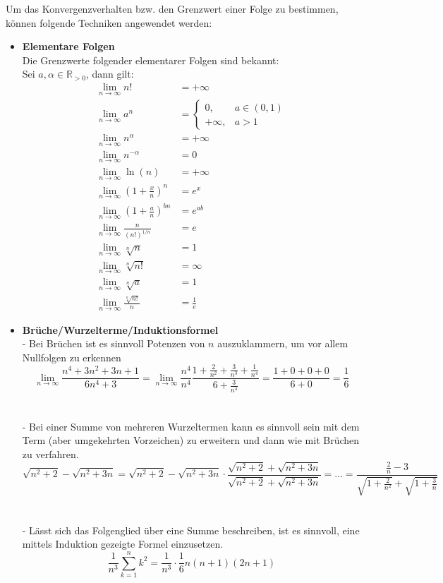 \documentclass{article}
\newcommand{\lr}[1]{\left(#1\right)}
\begin{document}
Um das Konvergenzverhalten bzw. den Grenzwert einer Folge zu bestimmen, können folgende Techniken angewendet werden:
\begin{itemize}
	\item \textbf{Elementare Folgen}\\
	Die Grenzwerte folgender elementarer Folgen sind bekannt:\\
	Sei $a,\alpha \in \mathbb{R}_{>0}$, dann gilt:
	\begin{align*}
		\lim_{n\rightarrow\infty} n! &= +\infty\\
		\lim_{n\rightarrow\infty} a^n &= 
			\begin{cases}
				0, & a\in(0,1)\\
				+\infty, & a > 1
			\end{cases}\\
		\lim_{n\rightarrow\infty} n^\alpha &= +\infty\\
		\lim_{n\rightarrow\infty} n^{-\alpha} &= 0\\
		\lim_{n\rightarrow\infty} \ln(n) &= +\infty\\
		\lim_{n\rightarrow\infty} \lr{1 + \frac{x}{n}}^n &= e^x\\
		\lim_{n\rightarrow\infty} \lr{1 + \frac{a}{n}}^{bn} &= e^{ab}\\
		\lim_{n\rightarrow\infty} \frac{n}{(n!)^{1/n}} &= e\\
		\lim_{n\rightarrow\infty} \sqrt[n]{n} &= 1\\
		\lim_{n\rightarrow\infty} \sqrt[n]{n!} &= \infty\\
		\lim_{n\rightarrow\infty} \sqrt[n]{a} &= 1\\
		\lim_{n\rightarrow\infty} \frac{\sqrt[n]{n!}}{n} &= \frac{1}{e}
	\end{align*}


\newpage


	\item \textbf{Brüche/Wurzelterme/Induktionsformel}\\
	- Bei Brüchen ist es sinnvoll Potenzen von $n$ auszuklammern, um vor allem Nullfolgen zu erkennen\\
	{\color{blue}
		$$\lim_{n\rightarrow\infty} \frac{n^4 + 3n^2 + 3n + 1}{6n^4 + 3} = \lim_{n\rightarrow\infty} \frac{{n^4}}{{n^4}} \frac{1 + \frac{2}{n^2} + \frac{3}{n^3} + \frac{1}{n^4}}{6 + \frac{3}{n^4}} = \frac{1 + 0 + 0 + 0}{6 + 0} = \frac{1}{6}$$
	}\\
	\\
	- Bei einer Summe von mehreren Wurzeltermen kann es sinnvoll sein mit dem Term (aber umgekehrten Vorzeichen) zu erweitern und dann wie mit Brüchen zu verfahren.\\
	{\color{blue}
		$$\sqrt{n^2 + 2} - \sqrt{n^2 + 3n} = \sqrt{n^2 + 2} - \sqrt{n^2 + 3n} \cdot \frac{\sqrt{n^2 + 2} + \sqrt{n^2 + 3n}}{\sqrt{n^2 + 2} + \sqrt{n^2 + 3n}} = ... = \frac{\frac{2}{n} - 3}{\sqrt{1 + \frac{2}{n^2}} + \sqrt{1 + \frac{3}{n}}}$$}\\
	\\
	- Lässt sich das Folgenglied über eine Summe beschreiben, ist es sinnvoll, eine mittels Induktion gezeigte Formel einzusetzen.\\
	{\color{blue}
		$$\frac{1}{n^3} \sum_{k=1}^n k^2 = \frac{1}{n^3} \cdot \frac{1}{6}n(n+1)(2n+1)$$
	}



\end{itemize}
\end{document}
